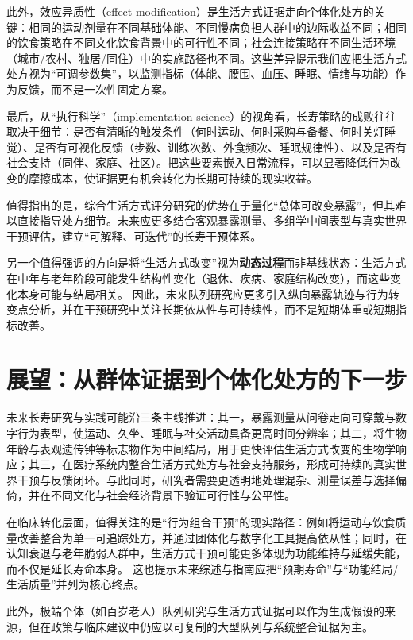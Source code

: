 \documentclass[11pt,a4paper]{article}
\begin{document}
此外，效应异质性（effect modification）是生活方式证据走向个体化处方的关键：相同的运动剂量在不同基础体能、不同慢病负担人群中的边际收益不同；相同的饮食策略在不同文化饮食背景中的可行性不同；社会连接策略在不同生活环境（城市/农村、独居/同住）中的实施路径也不同。这些差异提示我们应把生活方式处方视为“可调参数集”，以监测指标（体能、腰围、血压、睡眠、情绪与功能）作为反馈，而不是一次性固定方案。

最后，从“执行科学”（implementation science）的视角看，长寿策略的成败往往取决于细节：是否有清晰的触发条件（何时运动、何时采购与备餐、何时关灯睡觉）、是否有可视化反馈（步数、训练次数、外食频次、睡眠规律性）、以及是否有社会支持（同伴、家庭、社区）。把这些要素嵌入日常流程，可以显著降低行为改变的摩擦成本，使证据更有机会转化为长期可持续的现实收益。

值得指出的是，综合生活方式评分研究的优势在于量化“总体可改变暴露”，但其难以直接指导处方细节。未来应更多结合客观暴露测量、多组学中间表型与真实世界干预评估，建立“可解释、可迭代”的长寿干预体系。\cite{plasmametabolitesof2023,crucialfactorsaffecting2023}

另一个值得强调的方向是将“生活方式改变”视为\textbf{动态过程}而非基线状态：生活方式在中年与老年阶段可能发生结构性变化（退休、疾病、家庭结构改变），而这些变化本身可能与结局相关。\cite{lifestylechangesto2022} 因此，未来队列研究应更多引入纵向暴露轨迹与行为转变点分析，并在干预研究中关注长期依从性与可持续性，而不是短期体重或短期指标改善。

\section{展望：从群体证据到个体化处方的下一步}

未来长寿研究与实践可能沿三条主线推进：其一，暴露测量从问卷走向可穿戴与数字行为表型，使运动、久坐、睡眠与社交活动具备更高时间分辨率；其二，将生物年龄与表观遗传钟等标志物作为中间结局，用于更快评估生活方式改变的生物学响应；其三，在医疗系统内整合生活方式处方与社会支持服务，形成可持续的真实世界干预与反馈闭环。与此同时，研究者需要更透明地处理混杂、测量误差与选择偏倚，并在不同文化与社会经济背景下验证可行性与公平性。

在临床转化层面，值得关注的是“行为组合干预”的现实路径：例如将运动与饮食质量改善整合为单一可追踪处方，并通过团体化与数字化工具提高依从性；同时，在认知衰退与老年脆弱人群中，生活方式干预可能更多体现为功能维持与延缓失能，而不仅是延长寿命本身。\cite{dementiapreventionintervention2020,adherencetoa2024} 这也提示未来综述与指南应把“预期寿命”与“功能结局/生活质量”并列为核心终点。

此外，极端个体（如百岁老人）队列研究与生活方式证据可以作为生成假设的来源，但在政策与临床建议中仍应以可复制的大型队列与系统整合证据为主。\cite{ahealthylifestyle2018,runningandmortality2016}
\end{document}

